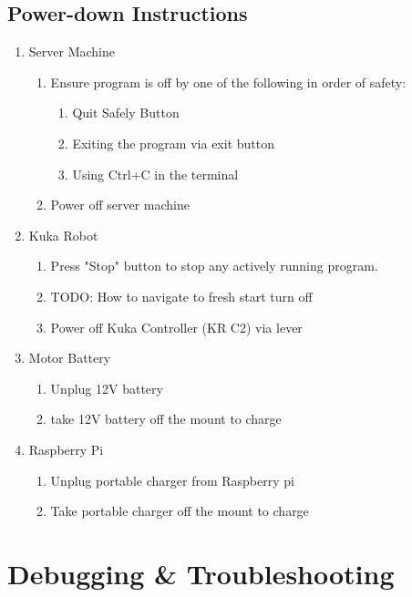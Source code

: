 \documentclass{ol-softwaremanual}
\begin{document}
\subsection{Power-down Instructions}
\begin{enumerate}
    \item Server Machine
    \begin{enumerate}
        \item Ensure program is off by one of the following in order of safety:
        \begin{enumerate}
            \item Quit Safely Button
            \item Exiting the program via exit button
            \item Using Ctrl+C in the terminal
        \end{enumerate}
        \item Power off server machine
    \end{enumerate}
    \item Kuka Robot
    \begin{enumerate}
        \item Press "Stop" button to stop any actively running program.
        \item TODO: How to navigate to fresh start turn off
        \item Power off Kuka Controller (KR C2) via lever
    \end{enumerate}
    \item Motor Battery
    \begin{enumerate}
        \item Unplug 12V battery
        \item take 12V battery off the mount to charge
    \end{enumerate}
    \item Raspberry Pi
    \begin{enumerate}
        \item Unplug portable charger from Raspberry pi
        \item Take portable charger off the mount to charge
    \end{enumerate}
\end{enumerate}



\section{Debugging \& Troubleshooting}\hypertarget{Debugging \& Troubleshooting}{}
\end{document}
